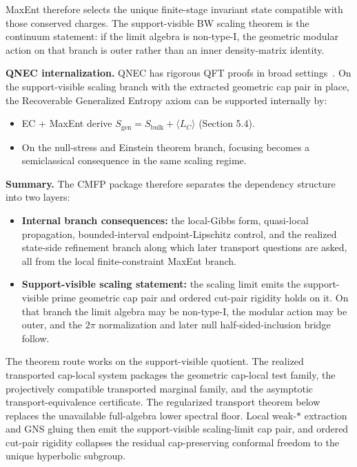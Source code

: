 MaxEnt therefore selects the unique finite-stage invariant state compatible with those conserved charges. The support-visible BW scaling theorem is the continuum statement: if the limit algebra is non-type-I, the geometric modular action on that branch is outer rather than an inner density-matrix identity.

\textbf{QNEC internalization.} QNEC has rigorous QFT proofs in broad settings~\cite{bousso16}. On the support-visible scaling branch with the extracted geometric cap pair in place, the Recoverable Generalized Entropy axiom can be supported internally by:
\begin{itemize}
\item
EC + MaxEnt derive \(S_{\mathrm{gen}}=S_{\mathrm{bulk}}+\langle L_C\rangle\) (Section 5.4).
\item
On the null-stress and Einstein theorem branch, focusing becomes a semiclassical consequence in the same scaling regime.
\end{itemize}

\textbf{Summary.} The CMFP package therefore separates the dependency structure into two layers:
\begin{itemize}
\item
\textbf{Internal branch consequences:} the local-Gibbs form, quasi-local propagation, bounded-interval endpoint-Lipschitz control, and the realized state-side refinement branch along which later transport questions are asked, all from the local finite-constraint MaxEnt branch.
\item
\textbf{Support-visible scaling statement:} the scaling limit emits the support-visible prime geometric cap pair and ordered cut-pair rigidity holds on it. On that branch the limit algebra may be non-type-I, the modular action may be outer, and the \(2\pi\) normalization and later null half-sided-inclusion bridge follow.
\end{itemize}

The theorem route works on the support-visible quotient. The realized transported cap-local system packages the geometric cap-local test family, the projectively compatible transported marginal family, and the asymptotic transport-equivalence certificate. The regularized transport theorem below replaces the unavailable full-algebra lower spectral floor. Local weak-\(*\) extraction and GNS gluing then emit the support-visible scaling-limit cap pair, and ordered cut-pair rigidity collapses the residual cap-preserving conformal freedom to the unique hyperbolic subgroup.

